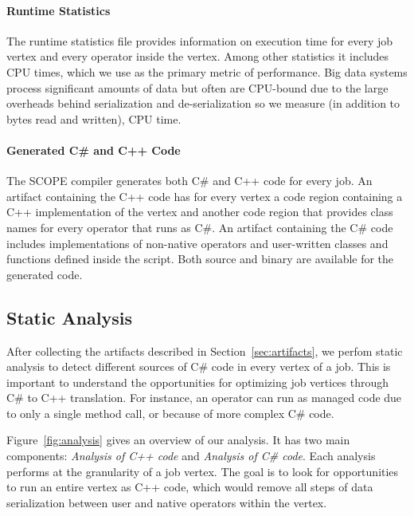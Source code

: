\paragraph{Runtime Statistics}
The runtime statistics file provides information on execution time for every job vertex and every operator inside the vertex. Among other statistics it includes CPU times, which we use as the primary metric of performance. Big data systems process significant amounts of data but often are CPU-bound\cite{Ousterhour} due to the large overheads behind serialization and de-serialization so we measure (in addition to bytes read and written), CPU time.



\paragraph{Generated C\# and C++ Code}
The SCOPE compiler generates both C\# and C++ code for every job.
An artifact containing the C++ code has for every vertex a code region containing a C++ implementation of the vertex and another code region that provides class names for every operator that runs as C\#.
An artifact containing the C\# code includes implementations of non-native operators and user-written classes and functions defined inside the script.
Both source and binary are available for the generated code.

\subsection{Static Analysis}

After collecting the artifacts described in Section~\ref{sec:artifacts}, we perfom static analysis to detect different sources of C\# code in every vertex of a job. This is important to understand the opportunities for optimizing job vertices through C\# to C++ translation. For instance, an operator can run as managed code due to only a single method call, or because of more complex C\# code.

Figure~\ref{fig:analysis} gives an overview of our analysis. It has two main components: \emph{Analysis of C++ code} and \emph{Analysis of C\# code}. Each analysis performs at the granularity of a job vertex. The goal is to look for opportunities to run an entire vertex as C++ code, which would remove all steps of data serialization between user and native operators within the vertex.


